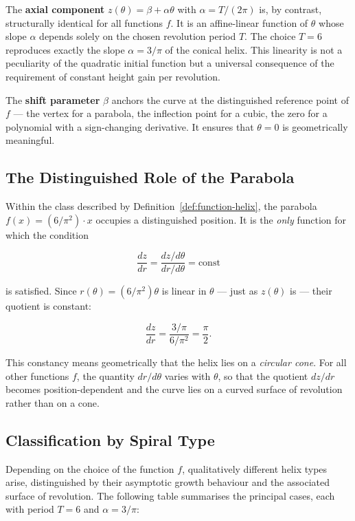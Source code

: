 The \textbf{axial component} $z(\theta) = \beta + \alpha\theta$ with
$\alpha = T/(2\pi)$ is, by contrast, structurally identical for all
functions $f$. It is an affine-linear function of $\theta$ whose slope
$\alpha$ depends solely on the chosen revolution period $T$. The choice
$T = 6$ reproduces exactly the slope $\alpha = 3/\pi$ of the conical
helix. This linearity is not a peculiarity of the quadratic initial
function but a universal consequence of the requirement of constant
height gain per revolution.

The \textbf{shift parameter} $\beta$ anchors the curve at the
distinguished reference point of $f$ --- the vertex for a parabola, the
inflection point for a cubic, the zero for a polynomial with a
sign-changing derivative. It ensures that $\theta = 0$ is geometrically
meaningful.

\subsection{The Distinguished Role of the Parabola}

Within the class described by Definition~\ref{def:function-helix}, the
parabola $f(x) = (6/\pi^2)\cdot x$ occupies a distinguished position.
It is the \emph{only} function for which the condition

\[
\frac{dz}{dr} = \frac{dz/d\theta}{dr/d\theta} = \text{const}
\]

is satisfied. Since $r(\theta) = (6/\pi^2)\theta$ is linear in
$\theta$ --- just as $z(\theta)$ is --- their quotient is constant:

\[
\frac{dz}{dr}
= \frac{3/\pi}{6/\pi^2}
= \frac{\pi}{2}.
\]

This constancy means geometrically that the helix lies on a
\emph{circular cone}. For all other functions $f$, the quantity
$dr/d\theta$ varies with $\theta$, so that the quotient $dz/dr$ becomes
position-dependent and the curve lies on a curved surface of revolution
rather than on a cone.

\subsection{Classification by Spiral Type}

Depending on the choice of the function $f$, qualitatively different
helix types arise, distinguished by their asymptotic growth behaviour
and the associated surface of revolution. The following table summarises
the principal cases, each with period $T = 6$ and $\alpha = 3/\pi$:


